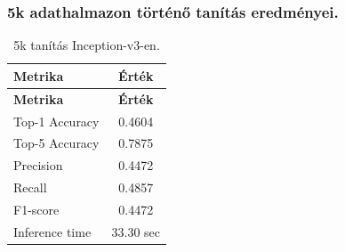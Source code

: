 \subsubsection{5k adathalmazon történő tanítás eredményei.}
  \begin{center}
    \begin{longtable}{l c}
    \caption{5k tanítás Inception-v3-en.} \label{tab:phase03_Inception-v3_5k} \\
    \toprule
    \textbf{Metrika} & \textbf{Érték} \\
    \midrule
    \endfirsthead
    \toprule
    \textbf{Metrika} & \textbf{Érték} \\
    \midrule
    \endhead
    Top-1 Accuracy & 0.4604 \\
    Top-5 Accuracy & 0.7875 \\
    Precision      & 0.4472 \\
    Recall         & 0.4857 \\
    F1-score       & 0.4472 \\
    Inference time & 33.30 sec \\
    \bottomrule
    \end{longtable}
  \end{center}

